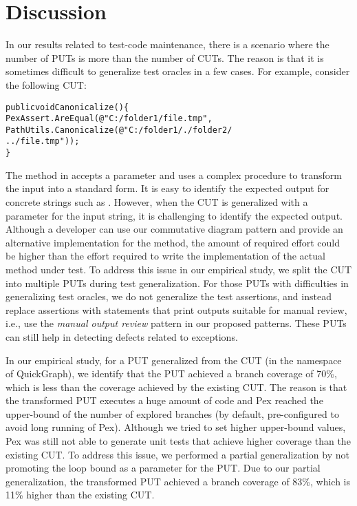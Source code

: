 \section{Discussion} 
\label{sec:limitations}

In our results related to test-code maintenance, there is a scenario where the number of PUTs is more than the number of CUTs. The reason is that it is sometimes difficult to generalize test oracles in a few cases. For example, consider the following CUT:\vspace*{-1.5ex}

\begin{CodeOut}
\begin{alltt}
public void Canonicalize() \{
\hspace*{0.1in}PexAssert.AreEqual(@"C:/folder1/file.tmp",
\hspace*{0.3in}PathUtils.Canonicalize(@"C:/folder1/./folder2/
\hspace*{0.3in}../file.tmp")); 
\}
\end{alltt}
\end{CodeOut} \vspace*{-1.5ex}

\noindent The  method in  accepts a  parameter and uses a complex procedure to transform the input into a standard form. It is easy to identify the expected output for concrete strings such as . However, when the CUT is generalized with a parameter for the input string, it is challenging to identify the expected output. Although a developer can use our commutative diagram pattern and provide an alternative implementation for the  method, the amount of required effort could be higher than the effort required to write the implementation of the actual method under test. To address this issue in our empirical study, we split the CUT into multiple PUTs during test generalization. For those PUTs with difficulties in generalizing test oracles, we do not generalize the test assertions, and instead replace assertions with statements that print outputs suitable for manual review, i.e., use the \emph{manual output review} pattern in our proposed patterns. These PUTs can still help in detecting defects related to exceptions.

In our empirical study, for a PUT generalized from the CUT  (in the  namespace of QuickGraph), we identify that the PUT achieved a branch coverage of 70\%, which is less than the coverage achieved by the existing CUT. The reason is that the transformed PUT executes a huge amount of code and Pex reached the upper-bound of the number of explored branches (by default, pre-configured to avoid long running of Pex). Although we tried to set higher upper-bound values, Pex was still not able to generate unit tests that achieve higher coverage than the existing CUT. To address this issue, we performed a partial generalization by not promoting the loop bound as a parameter for the PUT. Due to our partial generalization, the transformed PUT achieved a branch coverage of 83\%, which is 11\% higher than the existing CUT.

